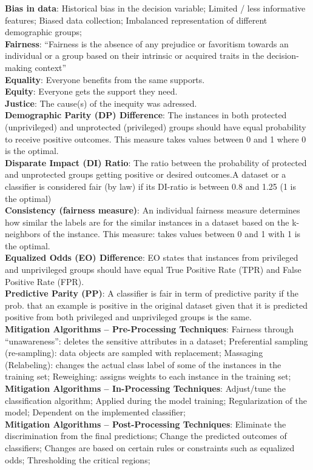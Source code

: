 \documentclass[a4paper,7pt,landscape]{extarticle}
\begin{document}
\begin{multicols}{3}
\begin{boxA}
\textbf{Bias in data}: Historical bias in the decision variable; Limited / less informative features; Biased data collection; Imbalanced representation of different demographic groups;\\
\textbf{Fairness}: “Fairness is the absence of any prejudice or favoritism towards an individual or a group based on their intrinsic or acquired traits in the decision-making context”\\
\textbf{Equality}: Everyone benefits from the same supports.\\
\textbf{Equity}: Everyone gets the support they need.\\
\textbf{Justice}: The cause(s) of the inequity was adressed.\\
\textbf{Demographic Parity (DP) Difference}: The instances in both protected (unprivileged) and unprotected (privileged) groups should have equal probability to receive positive outcomes. This measure takes values between 0 and 1 where 0 is the optimal.\\
\textbf{Disparate Impact (DI) Ratio}: The ratio between the probability of protected and unprotected groups getting positive or desired outcomes.A dataset or a classifier is considered fair (by law) if its DI-ratio is between 0.8 and 1.25 (1 is the optimal)\\
\textbf{Consistency (fairness measure)}: An individual fairness measure determines how similar the labels are for the similar instances in a dataset based on the k-neighbors of the instance. This measure: takes values between 0 and 1 with 1 is the optimal.\\
\textbf{Equalized Odds (EO) Difference}: EO states that instances from privileged and unprivileged groups should have equal True Positive Rate (TPR) and False Positive Rate (FPR).\\
\textbf{Predictive Parity (PP)}: A classifier is fair in term of predictive parity if the prob. that an example is positive in the original dataset given that it is predicted positive from both privileged and unprivileged groups is the same.\\
\textbf{Mitigation Algorithms – Pre-Processing Techniques}: Fairness through “unawareness”: deletes the sensitive attributes in a dataset; Preferential sampling (re-sampling): data objects are sampled with replacement; Massaging (Relabeling): changes the actual class label of some of the instances in the training set; Reweighing: assigns weights to each instance in the training set;\\
\textbf{Mitigation Algorithms – In-Processing Techniques}: Adjust/tune the classification algorithm; Applied during the model training; Regularization of the model; Dependent on the implemented classifier;\\
\textbf{Mitigation Algorithms – Post-Processing Techniques}: Eliminate the discrimination from the final predictions; Change the predicted outcomes of classifiers; Changes are based on certain rules or constraints such as equalized odds; Thresholding the critical regions;


\end{boxA}
\end{multicols}
\end{document}
